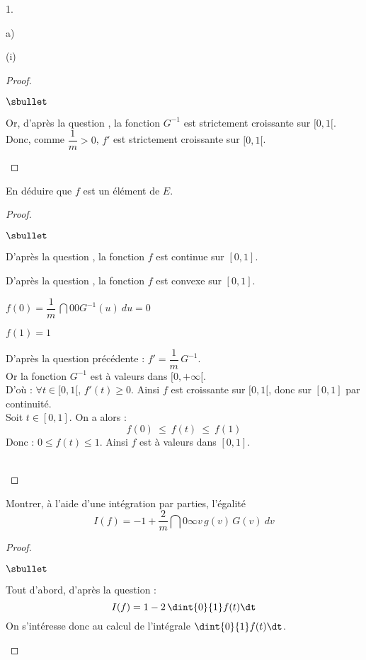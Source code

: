 \begin{noliste}{1.}
\begin{noliste}{a)}
\begin{nonoliste}{(i)}
\begin{proof}
\begin{noliste}{$\sbullet$}
      \item Or, d'après la question , la fonction $G^{-1}$
      est strictement croissante sur $[0,1[$.\\[.1cm]
      Donc, comme $\dfrac{1}{m} >0$, $f'$ est strictement croissante
      sur $[0,1[$.
      \conc{D'où, d'après la question \itbf{1.b)}, $f$ est 
      convexe sur $[0,1[$.}~\\[-1.2cm]
     \end{noliste}
   \end{proof}
   
   \item En déduire que $f$ est un élément de $E$.
   
   \begin{proof}~
     \begin{noliste}{$\sbullet$}
      \item D'après la question , la fonction $f$ est 
      continue sur $[0,1]$.
      \item D'après la question , la fonction $f$ 
      est convexe sur $[0,1]$.
      \item $f(0)=\dfrac{1}{m} \, \dint{0}{0} G^{-1}(u) \ du =0$
      \item $f(1)=1$
      \item D'après la question précédente : $f'=\dfrac{1}{m} \,
      G^{-1}$.\\[.1cm]
      Or la fonction $G^{-1}$ est à valeurs dans $[0,+\infty[$.\\
      D'où : $\forall t \in [0,1[$, $f'(t) \geq 0$. Ainsi $f$ est 
      croissante sur $[0,1[$, donc sur $[0,1]$ par continuité.\\
      Soit $t\in [0,1]$. On a alors :
      \[
        f(0) \ \leq \ f(t) \ \leq \ f(1)
      \]
      Donc : $0\leq f(t) \leq 1$. Ainsi $f$ est à valeurs dans $[0,1]$.
     \end{noliste}
     ~\\[-1cm]
   \end{proof}
  \end{nonoliste}
  
  \item Montrer, à l'aide d'une intégration par parties, l'égalité
  \[
   I(f)= -1+\dfrac{2}{m} \dint{0}{\infty} v \, g(v) \, G(v) \ dv
  \]
  
  \begin{proof}~
    \begin{noliste}{$\sbullet$}
      \item Tout d'abord, d'après la question  :
      \[
        I(f) = 1-2 \, \dint{0}{1} f(t) \dt
      \]
      On s'intéresse donc au calcul de l'intégrale 
      $\dint{0}{1} f(t) \dt$.


\end{noliste}
\end{proof}
\end{noliste}
\end{noliste}
